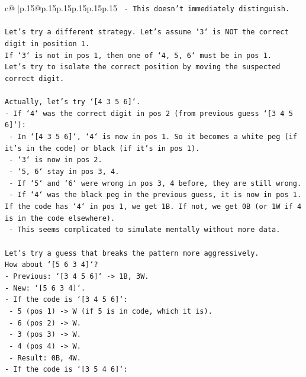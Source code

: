 \documentclass{article}
\begin{document}
{\begin{supertabular}{c@{$\;$}|p{.15\linewidth}@{}p{.15\linewidth}p{.15\linewidth}p{.15\linewidth}p{.15\linewidth}p{.15\linewidth}}
{{{\texttt{    {-} This doesn't immediately distinguish.} \\
\\ 
\texttt{Let's try a different strategy. Let's assume `3` is NOT the correct digit in position 1.} \\
\texttt{If `3` is not in pos 1, then one of `4, 5, 6` must be in pos 1.} \\
\texttt{Let's try to isolate the correct position by moving the suspected correct digit.} \\
\\ 
\texttt{Actually, let's try `{[}4 3 5 6{]}`.} \\
\texttt{{-} If `4` was the correct digit in pos 2 (from previous guess `{[}3 4 5 6{]}`):} \\
\texttt{    {-} In `{[}4 3 5 6{]}`, `4` is now in pos 1. So it becomes a white peg (if it's in the code) or black (if it's in pos 1).} \\
\texttt{    {-} `3` is now in pos 2.} \\
\texttt{    {-} `5, 6` stay in pos 3, 4.} \\
\texttt{    {-} If `5` and `6` were wrong in pos 3, 4 before, they are still wrong.} \\
\texttt{    {-} If `4` was the black peg in the previous guess, it is now in pos 1. If the code has `4` in pos 1, we get 1B. If not, we get 0B (or 1W if 4 is in the code elsewhere).} \\
\texttt{    {-} This seems complicated to simulate mentally without more data.} \\
\\ 
\texttt{Let's try a guess that breaks the pattern more aggressively.} \\
\texttt{How about `{[}5 6 3 4{]}`?} \\
\texttt{{-} Previous: `{[}3 4 5 6{]}` {-}> 1B, 3W.} \\
\texttt{{-} New: `{[}5 6 3 4{]}`.} \\
\texttt{{-} If the code is `{[}3 4 5 6{]}`:} \\
\texttt{    {-} 5 (pos 1) {-}> W (if 5 is in code, which it is).} \\
\texttt{    {-} 6 (pos 2) {-}> W.} \\
\texttt{    {-} 3 (pos 3) {-}> W.} \\
\texttt{    {-} 4 (pos 4) {-}> W.} \\
\texttt{    {-} Result: 0B, 4W.} \\
\texttt{{-} If the code is `{[}3 5 4 6{]}`:} \\
}}}
\end{supertabular}}
\end{document}
